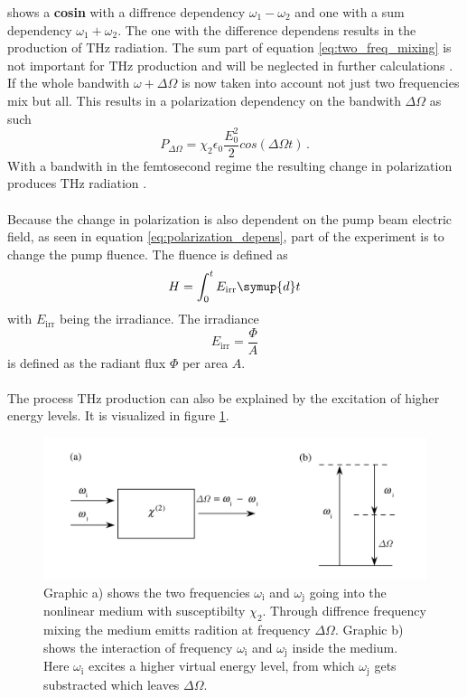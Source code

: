shows a \textbf{cosin} with a diffrence dependency $\omega_1-\omega_2$ and one with a sum dependency $\omega_1+\omega_2$.
The one with the difference dependens results in the production of $\si{\tera\hertz}$ radiation. %
The sum part of equation \eqref{eq:two_freq_mixing} is not important for $\si{\tera\hertz}$ production and will be neglected in further calculations \cite[45--46]{wiki_book}.
If the whole bandwith $\omega + \Delta\Omega$ is now taken into account not just two frequencies mix but all.
This results in a polarization dependency on the bandwith $\Delta\Omega$ as such
\begin{equation}
    P_{\Delta\Omega} = \chi_2 \epsilon_0 \frac{E_0^2}{2}cos(\Delta\Omega t) \, .
    \label{eq:polarization_depens}
\end{equation}
With a bandwith in the femtosecond regime the resulting change in polarization produces $\si{\tera\hertz}$ radiation \cite[289--291]{book_optical_rectification}\cite[46]{wiki_book}.
\\\\
Because the change in polarization is also dependent on the pump beam electric field, as seen in equation \ref{eq:polarization_depens}, part of the experiment is to change the pump fluence.
The fluence is defined as 
\begin{equation}
    H = \int_{0}^{t} E_\text{irr} \symup{d}t
    \label{eq:fluence}
\end{equation}
with $E_\text{irr}$ being the irradiance.
The irradiance 
\begin{equation}
    E_\text{irr} = \frac{\Phi}{A}
    \label{eq:irradiance}
\end{equation} 
is defined as the radiant flux $\Phi$ per area $A$.
\\\\
The process $\si{\tera\hertz}$ production can also be explained by the excitation of higher energy levels.
It is visualized in figure \ref{fig:freq_mix}.
\begin{figure}
    \centering
    \includegraphics[width=\textwidth]{refferenced_pic/diffrence_frequency_mixing.PNG}
    \caption{Graphic a) shows the two frequencies $\omega_\text{i} $ and $\omega_\text{j}$ going into the nonlinear medium with susceptibilty $\chi_2$.
    Through diffrence frequency mixing the medium emitts radition at frequency $\Delta\Omega$.
    Graphic b) shows the interaction of frequency $\omega_\text{i} $ and $\omega_\text{j}$ inside the medium.
    Here $\omega_\text{i}$ excites a higher virtual energy level, from which $\omega_\text{j}$ gets substracted which leaves $\Delta\Omega$.}
    \label{fig:freq_mix}
\end{figure}
